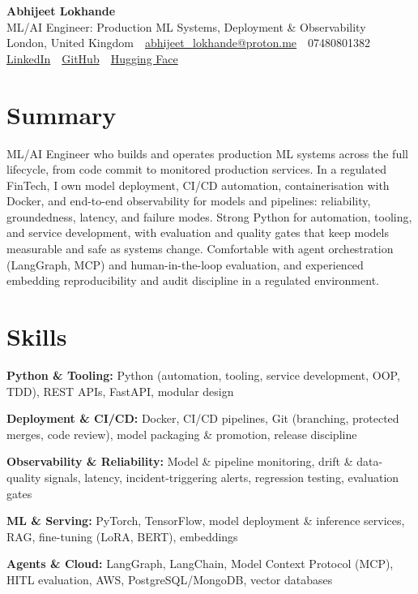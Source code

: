 \documentclass[10pt,a4paper]{article}
\newcommand{\sep}{\,\textcolor{accent!60}{\textbar}\,}
\begin{document}
\begin{center}
  {\fontsize{24}{26}\selectfont\bfseries Abhijeet Lokhande}\\[3pt]
  {\color{accent}\large ML/AI Engineer: Production ML Systems, Deployment \& Observability}\\[5pt]
  {\small
    London, United Kingdom \sep
    \href{mailto:abhijeet_lokhande@proton.me}{abhijeet\_lokhande@proton.me} \sep
    07480801382 \\[2pt]
    \href{https://www.linkedin.com/in/ablds/}{LinkedIn} \sep
    \href{https://github.com/abhijeetscode}{GitHub} \sep
    \href{https://huggingface.co/ab-ai}{Hugging Face}
  }
\end{center}
\vspace{2pt}

\section{Summary}
ML/AI Engineer who builds and operates production ML systems across the full lifecycle, from code commit to monitored production services. In a regulated FinTech, I own model deployment, CI/CD automation, containerisation with Docker, and end-to-end observability for models and pipelines: reliability, groundedness, latency, and failure modes. Strong Python for automation, tooling, and service development, with evaluation and quality gates that keep models measurable and safe as systems change. Comfortable with agent orchestration (LangGraph, MCP) and human-in-the-loop evaluation, and experienced embedding reproducibility and audit discipline in a regulated environment.

\section{Skills}
\begin{tight}
  \item[\textcolor{accent}{\small$\bullet$}] \textbf{Python \& Tooling:} Python (automation, tooling, service development, OOP, TDD), REST APIs, FastAPI, modular design
  \item[\textcolor{accent}{\small$\bullet$}] \textbf{Deployment \& CI/CD:} Docker, CI/CD pipelines, Git (branching, protected merges, code review), model packaging \& promotion, release discipline
  \item[\textcolor{accent}{\small$\bullet$}] \textbf{Observability \& Reliability:} Model \& pipeline monitoring, drift \& data-quality signals, latency, incident-triggering alerts, regression testing, evaluation gates
  \item[\textcolor{accent}{\small$\bullet$}] \textbf{ML \& Serving:} PyTorch, TensorFlow, model deployment \& inference services, RAG, fine-tuning (LoRA, BERT), embeddings
  \item[\textcolor{accent}{\small$\bullet$}] \textbf{Agents \& Cloud:} LangGraph, LangChain, Model Context Protocol (MCP), HITL evaluation, AWS, PostgreSQL/MongoDB, vector databases
\end{tight}
\end{document}
